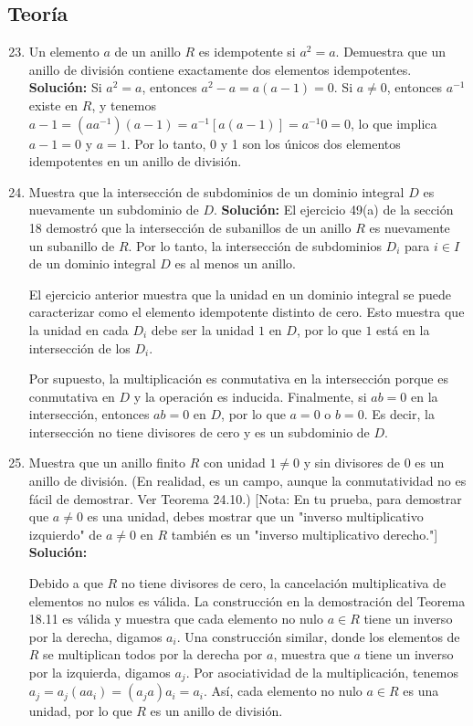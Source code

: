 \subsection*{Teoría}
\begin{enumerate}
	\setcounter{enumi}{22}
	\item Un elemento $a$ de un anillo $R$ es idempotente si $a^2 = a$. Demuestra que un anillo de división contiene exactamente dos elementos idempotentes.
	\textbf{Solución:}
	Si $a^2 = a$, entonces $a^2 - a = a(a - 1) = 0$. Si $a \neq 0$, entonces $a^{-1}$ existe en $R$, y tenemos $a - 1 = (a a^{-1})(a - 1) = a^{-1}[a(a-1)]=a^{-1}0=0$, lo que implica $a - 1 = 0$ y $a = 1$. Por lo tanto, 0 y 1 son los únicos dos elementos idempotentes en un anillo de división.
	
	\item Muestra que la intersección de subdominios de un dominio integral $D$ es nuevamente un subdominio de $D$. 
	\textbf{Solución:}
	El ejercicio 49(a) de la sección 18 demostró que la intersección de subanillos de un anillo $R$ es nuevamente un subanillo de $R$. Por lo tanto, la intersección de subdominios $D_i$ para $i \in I$ de un dominio integral $D$ es al menos un anillo.
	
	El ejercicio anterior muestra que la unidad en un dominio integral se puede caracterizar como el elemento idempotente distinto de cero. Esto muestra que la unidad en cada $D_i$ debe ser la unidad $1$ en $D$, por lo que $1$ está en la intersección de los $D_i$.
	
	Por supuesto, la multiplicación es conmutativa en la intersección porque es conmutativa en $D$ y la operación es inducida. Finalmente, si $ab = 0$ en la intersección, entonces $ab = 0$ en $D$, por lo que $a = 0$ o $b = 0$. Es decir, la intersección no tiene divisores de cero y es un subdominio de $D$.
	
	
	\item Muestra que un anillo finito $R$ con unidad $1 \neq 0$ y sin divisores de $0$ es un anillo de división. (En realidad, es un campo, aunque la conmutatividad no es fácil de demostrar. Ver Teorema 24.10.) [Nota: En tu prueba, para demostrar que $a\not = 0$ es una unidad, debes mostrar que un "inverso multiplicativo izquierdo" de $a\not = 0$ en $R$ también es un "inverso multiplicativo derecho."] 
	\textbf{Solución:}
	
	Debido a que \(R\) no tiene divisores de cero, la cancelación multiplicativa de elementos no nulos es válida. La construcción en la demostración del Teorema 18.11 es válida y muestra que cada elemento no nulo \(a \in R\) tiene un inverso por la derecha, digamos \(a_i\). Una construcción similar, donde los elementos de \(R\) se multiplican todos por la derecha por \(a\), muestra que \(a\) tiene un inverso por la izquierda, digamos \(a_j\). Por asociatividad de la multiplicación, tenemos \(a_j = a_j (aa_i) = (a_j a) a_i = a_i\). Así, cada elemento no nulo \(a \in R\) es una unidad, por lo que \(R\) es un anillo de división.
	

\end{enumerate}
